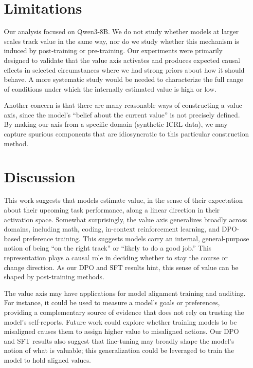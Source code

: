 \documentclass{article}
\begin{document}
\section{Limitations}
\label{sec:limitations}

Our analysis focused on Qwen3-8B. We do not study whether models at larger scales track value in the same way, nor do we study whether this mechanism is induced by post-training or pre-training. Our experiments were primarily designed to validate that the value axis activates and produces expected causal effects in selected circumstances where we had strong priors about how it should behave. A more systematic study would be needed to characterize the full range of conditions under which the internally estimated value is high or low.

Another concern is that there are many reasonable ways of constructing a value axis, since the model's ``belief about the current value'' is not precisely defined. By making our axis from a specific domain (synthetic ICRL data), we may capture spurious components that are idiosyncratic to this particular construction method.

\section{Discussion}
\label{sec:discussion}

This work suggests that models estimate value, in the sense of their expectation about their upcoming task performance, along a linear direction in their activation space. Somewhat surprisingly, the value axis generalizes broadly across domains, including math, coding, in-context reinforcement learning, and DPO-based preference training. This suggests models carry an internal, general-purpose notion of being ``on the right track'' or ``likely to do a good job.'' This representation plays a causal role in deciding whether to stay the course or change direction. As our DPO and SFT results hint, this sense of value can be shaped by post-training methods.

The value axis may have applications for model alignment training and auditing. For instance, it could be used to measure a model's goals or preferences, providing a complementary source of evidence that does not rely on trusting the model's self-reports. Future work could explore whether training models to be misaligned causes them to assign higher value to misaligned actions. Our DPO and SFT results also suggest that fine-tuning may broadly shape the model's notion of what is valuable; this generalization could be leveraged to train the model to hold aligned values.
\end{document}
